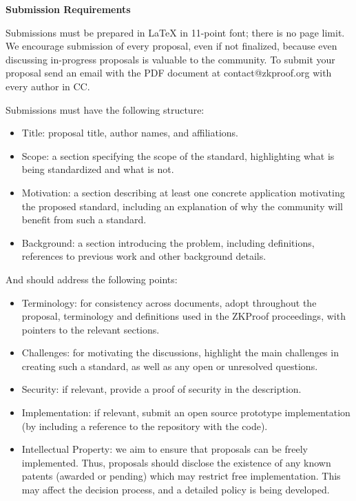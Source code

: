 \documentclass{article}
\begin{document}
	
{\bf Submission Requirements}

Submissions must be prepared in LaTeX in 11-point font; there is no page limit.
We encourage submission of every proposal, even if not finalized, because even discussing in-progress proposals is valuable to the community. To submit your proposal send an email with the PDF document at contact@zkproof.org with every author in CC.

Submissions must have the following structure:

\begin{itemize}
    \item Title: proposal title, author names, and affiliations.
    \item Scope: a section specifying the scope of the standard, highlighting what is being standardized and what is not.
    \item Motivation: a section describing at least one concrete application motivating the proposed standard, including an explanation of why the community will benefit from such a standard.
    \item Background: a section introducing the problem, including definitions, references to previous work and other background details.
\end{itemize}

And should address the following points:

\begin{itemize}
	\item Terminology: for consistency across documents, adopt throughout the proposal, terminology and definitions used in the ZKProof proceedings, with pointers to the relevant sections.
    \item Challenges: for motivating the discussions, highlight the main challenges in creating such a standard, as well as any open or unresolved questions.
    \item Security: if relevant, provide a proof of security in the description.
    \item Implementation: if relevant, submit an open source prototype implementation (by including a reference to the repository with the code).
    \item Intellectual Property: we aim to ensure that proposals can be freely implemented. Thus, proposals should disclose the existence of any known patents (awarded or pending) which may restrict free implementation. This may affect the decision process, and a detailed policy is being developed.
\end{itemize}
\end{document}
